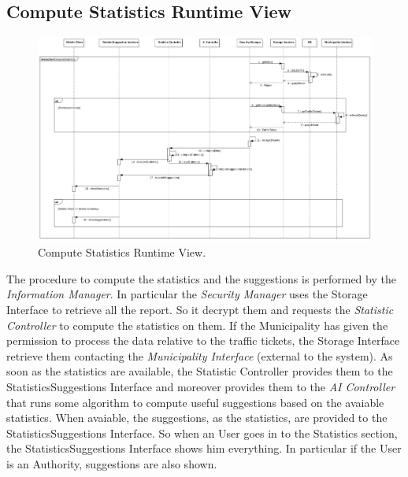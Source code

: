 \documentclass{report}
\begin{document}
\subsection{Compute Statistics Runtime View}
\begin{figure}[!ht]
	\begin{center}
	\includegraphics[width=\textwidth]{img/ComputeStatistics.png}
    \end{center}
    \label{fig:ComputeStatisticSD}
	\caption{Compute Statistics Runtime View.}
\end{figure}
The procedure to compute the statistics and the suggestions is performed by the \textit{Information Manager}. In particular the \textit{
Security Manager} uses the Storage Interface to retrieve all the report. So it decrypt them and requests the \textit{Statistic Controller} to compute the statistics on them. If the Municipality has given the permission to process the data relative to the traffic tickets, the Storage Interface retrieve them contacting the \textit{Municipality Interface} (external to the system). As soon as the statistics are available, the Statistic Controller provides them to the StatisticsSuggestions Interface and moreover provides them to the \textit{AI Controller} that runs some algorithm to compute useful suggestions based on the avaiable statistics.
When avaiable, the suggestions, as the statistics, are provided to the StatisticsSuggestions Interface. So when an User goes in to the Statistics section, the StatisticsSuggestions Interface shows him everything. 
In particular if the User is an Authority, suggestions are also shown.  
\end{document}
